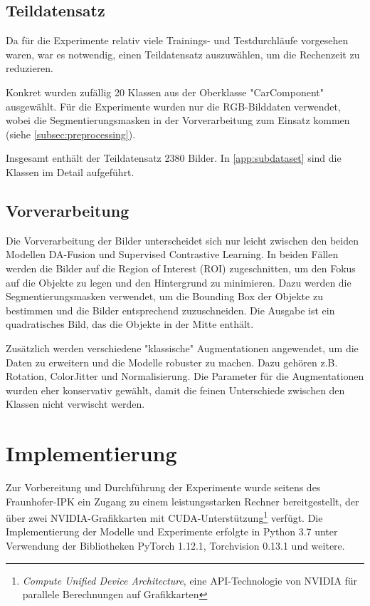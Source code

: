 \subsection{Teildatensatz} \label{subsec:subdataset}

Da für die Experimente relativ viele Trainings- und Testdurchläufe vorgesehen waren, war es notwendig, einen Teildatensatz auszuwählen, um die Rechenzeit zu reduzieren.

Konkret wurden zufällig 20 Klassen aus der Oberklasse "CarComponent" ausgewählt. Für die Experimente wurden nur die RGB-Bilddaten verwendet, wobei die Segmentierungsmasken in der Vorverarbeitung zum Einsatz kommen (siehe \autoref{subsec:preprocessing}).

Insgesamt enthält der Teildatensatz 2380 Bilder. In \autoref{app:subdataset} sind die Klassen im Detail aufgeführt.

\subsection{Vorverarbeitung} \label{subsec:preprocessing}

Die Vorverarbeitung der Bilder unterscheidet sich nur leicht zwischen den beiden Modellen DA-Fusion und Supervised Contrastive Learning. In beiden Fällen werden die Bilder auf die Region of Interest (ROI) zugeschnitten, um den Fokus auf die Objekte zu legen und den Hintergrund zu minimieren. Dazu werden die Segmentierungsmasken verwendet, um die Bounding Box der Objekte zu bestimmen und die Bilder entsprechend zuzuschneiden. Die Ausgabe ist ein quadratisches Bild, das die Objekte in der Mitte enthält.

Zusätzlich werden verschiedene "klassische" Augmentationen angewendet, um die Daten zu erweitern und die Modelle robuster zu machen. Dazu gehören z.B. Rotation, ColorJitter und Normalisierung. Die Parameter für die Augmentationen wurden eher konservativ gewählt, damit die feinen Unterschiede zwischen den Klassen nicht verwischt werden.

\section{Implementierung} \label{sec:implementation}

Zur Vorbereitung und Durchführung der Experimente wurde seitens des Fraunhofer-IPK ein Zugang zu einem leistungsstarken Rechner bereitgestellt, der über zwei NVIDIA-Grafikkarten mit CUDA-Unterstützung\footnote{\textit{Compute Unified Device Architecture}, eine API-Technologie von NVIDIA für parallele Berechnungen auf Grafikkarten} verfügt. Die Implementierung der Modelle und Experimente erfolgte in Python 3.7 unter Verwendung der Bibliotheken PyTorch 1.12.1, Torchvision 0.13.1 und weitere.

